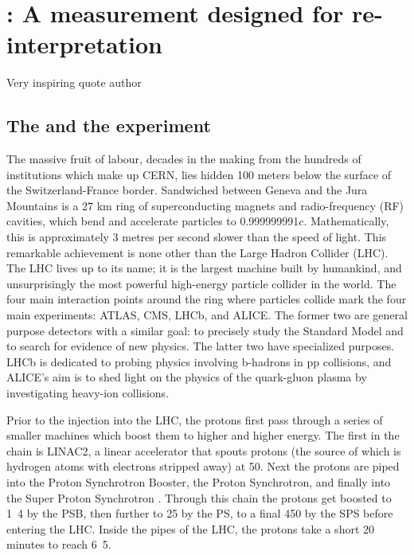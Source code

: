\chapter{\mFourL: A measurement designed for re-interpretation}
\label{chap:fourlepton}

{Very inspiring quote author}

\section{The \LHC and the \ATLAS experiment}
\label{sec:LHCandATLAS}

The massive fruit of labour, decades in the making from the hundreds of institutions which make up CERN, lies hidden 100 meters below the surface of the Switzerland-France border. Sandwiched between Geneva and the Jura Mountains is a 27 km ring of superconducting magnets and radio-frequency (RF) cavities, which bend and accelerate particles to 0.999999991$c$. Mathematically, this is approximately 3 metres per second slower than the speed of light. This remarkable achievement is none other than the Large Hadron Collider (LHC). The LHC lives up to its name; it is the largest machine built by humankind, and unsurprisingly the most powerful high-energy particle collider in the world. The four main interaction points around the ring where particles collide mark the four main experiments: ATLAS, CMS, LHCb, and ALICE. The former two are general purpose detectors with a similar goal: to precisely study the Standard Model and to search for evidence of new physics. The latter two have specialized purposes. LHCb is dedicated to probing physics involving b-hadrons in pp collisions, and ALICE’s aim is to shed light on the physics of the quark-gluon plasma by investigating heavy-ion collisions. 

Prior to the injection into the LHC, the protons first pass through a series of smaller machines which boost them to higher and higher energy. The first in the chain is LINAC2, a linear accelerator that spouts protons (the source of which is hydrogen atoms with electrons stripped away) at \unit{50}{\MeV}. Next the protons are piped into the Proton Synchrotron Booster, the Proton Synchrotron, and finally into the Super Proton Synchrotron . Through this chain the protons get boosted to \unit{1.4}{\GeV} by the PSB, then further to \unit{25}{\GeV} by the PS, to a final \unit{450}{\GeV} by the SPS before entering the LHC. Inside the pipes of the LHC, the protons take a short 20 minutes to reach \unit{6.5}{\TeV}. 


